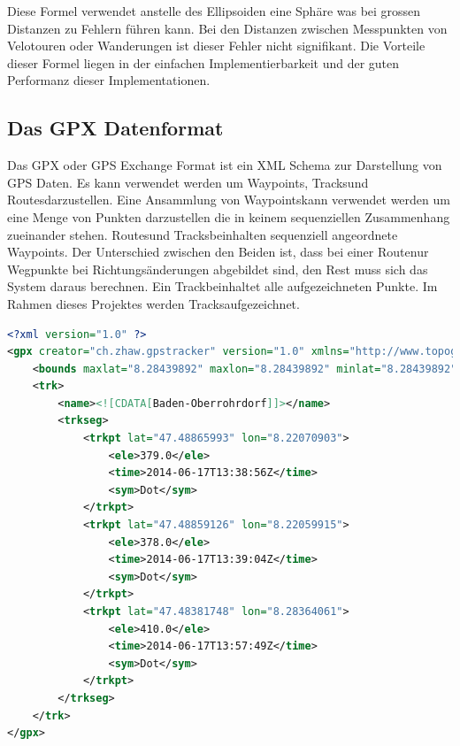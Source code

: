 Diese Formel verwendet anstelle des Ellipsoiden eine Sphäre was bei grossen Distanzen zu Fehlern führen kann. Bei den Distanzen zwischen Messpunkten von Velotouren oder Wanderungen ist dieser Fehler nicht signifikant. Die Vorteile dieser Formel liegen in der einfachen Implementierbarkeit und der guten Performanz dieser Implementationen. 

\subsection{Das GPX Datenformat}
Das GPX oder GPS Exchange Format ist ein XML Schema zur Darstellung von GPS Daten. Es kann verwendet werden um \flqq Waypoints\frqq, \flqq Tracks\frqq und \flqq Routes\frqq darzustellen. Eine Ansammlung von \flqq Waypoints\frqq kann verwendet werden um eine Menge von Punkten darzustellen die in keinem sequenziellen Zusammenhang zueinander stehen. \flqq Routes\frqq und \flqq Tracks\frqq beinhalten sequenziell angeordnete \flqq Waypoints\frqq. Der Unterschied zwischen den Beiden ist, dass bei einer \flqq Route\frqq nur Wegpunkte bei Richtungsänderungen abgebildet sind, den Rest muss sich das System daraus berechnen. Ein \flqq Track\frqq beinhaltet alle aufgezeichneten Punkte. Im Rahmen dieses Projektes werden \flqq Tracks\frqq aufgezeichnet. \cite{gpxwiki} \cite{gpx}

\begin{lstlisting}[language=XML, caption={GPX Beispielfile}]
<?xml version="1.0" ?>
<gpx creator="ch.zhaw.gpstracker" version="1.0" xmlns="http://www.topografix.com/GPX/1/0" xmlns:xsi="http://www.w3.org/2001/XMLSchema-instance" xsi:schemaLocation="http://www.topografix.com/GPX/1/0 http://www.topografix.com/GPX/1/0/gpx.xsd">
    <bounds maxlat="8.28439892" maxlon="8.28439892" minlat="8.28439892" minlon="8.28439892"/>
    <trk>
        <name><![CDATA[Baden-Oberrohrdorf]]></name>
        <trkseg>
            <trkpt lat="47.48865993" lon="8.22070903">
                <ele>379.0</ele>
                <time>2014-06-17T13:38:56Z</time>
                <sym>Dot</sym>
            </trkpt>
            <trkpt lat="47.48859126" lon="8.22059915">
                <ele>378.0</ele>
                <time>2014-06-17T13:39:04Z</time>
                <sym>Dot</sym>
            </trkpt>
            <trkpt lat="47.48381748" lon="8.28364061">
                <ele>410.0</ele>
                <time>2014-06-17T13:57:49Z</time>
                <sym>Dot</sym>
            </trkpt>
        </trkseg>
    </trk>
</gpx>
\end{lstlisting}